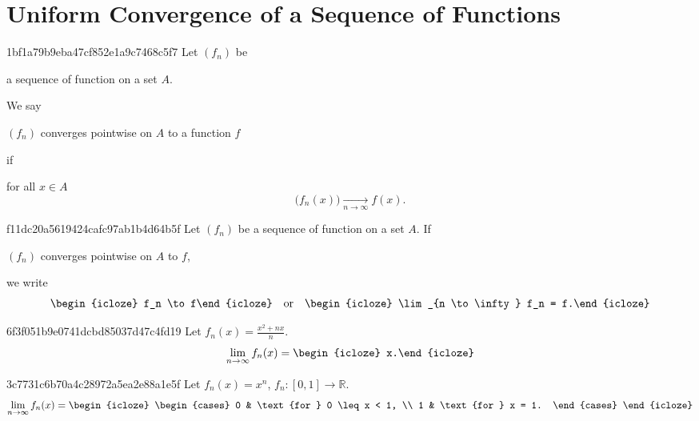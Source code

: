 


\section{Uniform Convergence of a Sequence of Functions} %
\begin{note}{1bf1a79b9eba47cf852e1a9c7468c5f7}
    Let \({ (f_n) }\) be \begin{icloze}{1}a sequence of function on a set \({ A }\).\end{icloze}
    We say \begin{icloze}{3}\({ \left( f_n \right) }\) converges pointwise on \({ A }\) to a function \({ f }\)\end{icloze} if
    \begin{icloze}{2}
        for all \({ x \in A }\)
        \[
            \Big(f_n(x)\Big) \underset{n \to \infty}{\longrightarrow} f(x).
        \]
    \end{icloze}
\end{note}

\begin{note}{f11dc20a5619424cafc97ab1b4d64b5f}
    Let \({ (f_n) }\) be a sequence of function on a set \({ A }\).
    If \begin{icloze}{2}\({ (f_n) }\) converges pointwise on \({ A }\) to \({ f }\),\end{icloze} we write
    \[
        \begin{icloze}{1}f_n \to f\end{icloze} \quad \text{or} \quad \begin{icloze}{1}\lim_{n \to \infty} f_n = f.\end{icloze}
    \]
\end{note}

\begin{note}{6f3f051b9e0741dcbd85037d47c4fd19}
    Let \({ f_n(x) = \frac{x^2 + nx}{n} }\).
    \[
        \lim_{n \to \infty} f_n(x) = \begin{icloze}{1}x.\end{icloze}
    \]
\end{note}

\begin{note}{3c7731c6b70a4c28972a5ea2e88a1e5f}
    Let \({ f_n(x) = x^{n} }\),\: \({ f_n : [0, 1] \to \mathbb R }\).
    \[
        \lim_{n \to \infty} f_n(x) =
        \begin{icloze}{1}
            \begin{cases}
                0 & \text{for } 0 \leq x < 1, \\
                1 & \text{for } x = 1.
            \end{cases}
        \end{icloze}
    \]
\end{note}

